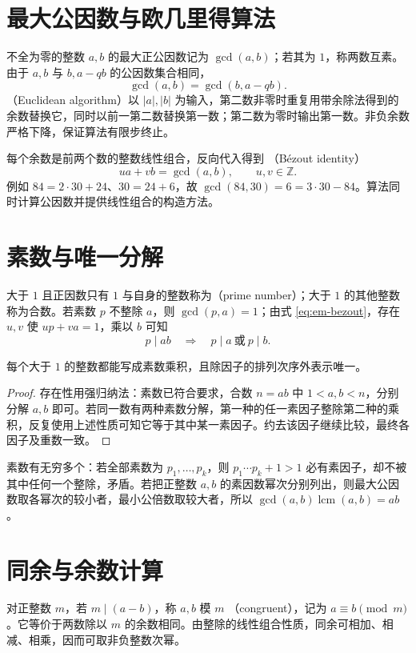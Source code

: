 \documentclass[UTF8]{ctexbook}
\begin{document}
\section{最大公因数与欧几里得算法}
不全为零的整数 $a,b$ 的最大正公因数记为 $\gcd(a,b)$；若其为 $1$，称两数互素。由于 $a,b$ 与 $b,a-qb$ 的公因数集合相同，
\[
 \gcd(a,b)=\gcd(b,a-qb).
\]
（Euclidean algorithm）以 $|a|,|b|$ 为输入，第二数非零时重复用带余除法得到的余数替换它，同时以前一第二数替换第一数；第二数为零时输出第一数。非负余数严格下降，保证算法有限步终止。

每个余数是前两个数的整数线性组合，反向代入得到 （Bézout identity）
\begin{equation}\label{eq:em-bezout}
 ua+vb=\gcd(a,b),\qquad u,v\in\mathbb Z.
\end{equation}
例如 $84=2\cdot30+24$、$30=24+6$，故 $\gcd(84,30)=6=3\cdot30-84$。算法同时计算公因数并提供线性组合的构造方法。

\section{素数与唯一分解}
大于 $1$ 且正因数只有 $1$ 与自身的整数称为（prime number）；大于 $1$ 的其他整数称为合数。若素数 $p$ 不整除 $a$，则 $\gcd(p,a)=1$；由式 \eqref{eq:em-bezout}，存在 $u,v$ 使 $up+va=1$，乘以 $b$ 可知
\[
 p\mid ab\quad\Longrightarrow\quad p\mid a\ \text{或}\ p\mid b.
\]
\begin{theorem}[算术基本定理]
每个大于 $1$ 的整数都能写成素数乘积，且除因子的排列次序外表示唯一。
\end{theorem}
\begin{proof}
存在性用强归纳法：素数已符合要求，合数 $n=ab$ 中 $1<a,b<n$，分别分解 $a,b$ 即可。若同一数有两种素数分解，第一种的任一素因子整除第二种的乘积，反复使用上述性质可知它等于其中某一素因子。约去该因子继续比较，最终各因子及重数一致。
\end{proof}
素数有无穷多个：若全部素数为 $p_1,\ldots,p_k$，则 $p_1\cdots p_k+1>1$ 必有素因子，却不被其中任何一个整除，矛盾。若把正整数 $a,b$ 的素因数幂次分别列出，则最大公因数取各幂次的较小者，最小公倍数取较大者，所以 $\gcd(a,b)\operatorname{lcm}(a,b)=ab$。

\section{同余与余数计算}
对正整数 $m$，若 $m\mid(a-b)$，称 $a,b$ 模 $m$ （congruent），记为 $a\equiv b\pmod m$。它等价于两数除以 $m$ 的余数相同。由整除的线性组合性质，同余可相加、相减、相乘，因而可取非负整数次幂。
\end{document}
